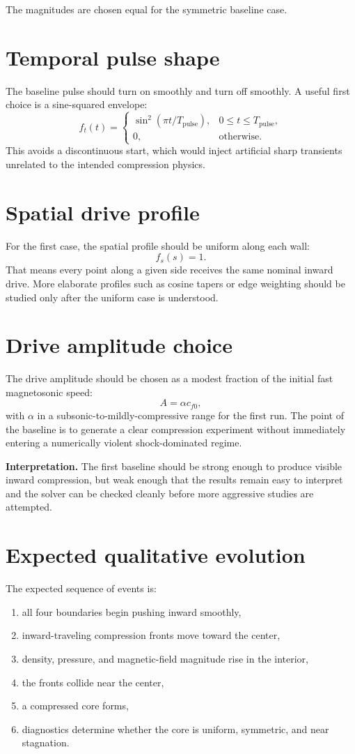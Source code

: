 \documentclass[11pt]{article}
\begin{document}
The magnitudes are chosen equal for the symmetric baseline case.

\section{Temporal pulse shape}
The baseline pulse should turn on smoothly and turn off smoothly. A useful first choice is a sine-squared envelope:
\[
f_t(t)=
\begin{cases}
\sin^2\!\left(\pi t / T_{\text{pulse}}\right), & 0\le t\le T_{\text{pulse}},\\
0, & \text{otherwise}.
\end{cases}
\]
This avoids a discontinuous start, which would inject artificial sharp transients unrelated to the intended compression physics.

\section{Spatial drive profile}
For the first case, the spatial profile should be uniform along each wall:
\[
f_s(s)=1.
\]
That means every point along a given side receives the same nominal inward drive. More elaborate profiles such as cosine tapers or edge weighting should be studied only after the uniform case is understood.

\section{Drive amplitude choice}
The drive amplitude should be chosen as a modest fraction of the initial fast magnetosonic speed:
\[
A = \alpha c_{f0},
\]
with $\alpha$ in a subsonic-to-mildly-compressive range for the first run. The point of the baseline is to generate a clear compression experiment without immediately entering a numerically violent shock-dominated regime.

\begin{physicsbox}
\textbf{Interpretation.} The first baseline should be strong enough to produce visible inward compression, but weak enough that the results remain easy to interpret and the solver can be checked cleanly before more aggressive studies are attempted.
\end{physicsbox}

\section{Expected qualitative evolution}
The expected sequence of events is:
\begin{enumerate}
    \item all four boundaries begin pushing inward smoothly,
    \item inward-traveling compression fronts move toward the center,
    \item density, pressure, and magnetic-field magnitude rise in the interior,
    \item the fronts collide near the center,
    \item a compressed core forms,
    \item diagnostics determine whether the core is uniform, symmetric, and near stagnation.
\end{enumerate}
\end{document}

